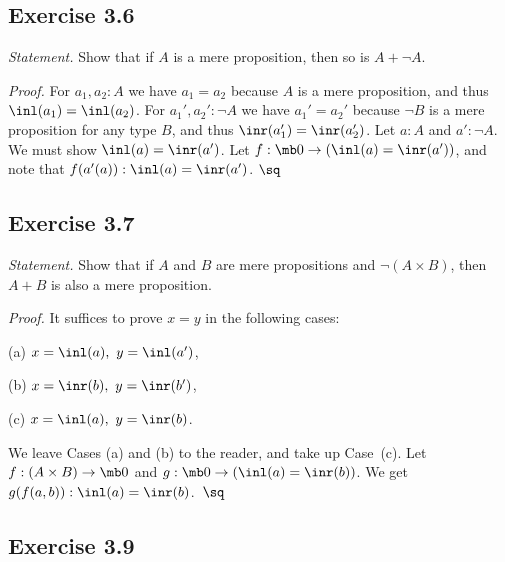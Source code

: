 \documentclass[12pt]{article}
\begin{document}

\subsection{Exercise 3.6}\label{e36}

\emph{Statement.} Show that if $A$ is a mere proposition, then so is $A+\neg A$.

\nn\emph{Proof.} For $a_1,a_2:A$ we have $a_1=a_2$ because $A$ is a mere proposition, and thus $\inl(a_1)=\inl(a_2)$. For $a_1',a_2':\neg A$ we have $a_1'=a_2'$ because $\neg B$ is a mere proposition for any type $B$, and thus $\inr(a_1')=\inr(a_2')$. Let $a:A$ and $a':\neg A$. We must show $\inl(a)=\inr(a')$. Let $f:\mb0\to(\inl(a)=\inr(a'))$, and note that $f(a'(a)):\inl(a)=\inr(a')$. $\sq$


\subsection{Exercise 3.7}

\emph{Statement.} Show that if $A$ and $B$ are mere propositions and $\neg(A\times B)$, then $A+B$ is also a mere proposition.

\emph{Proof.} %
It suffices to prove $x=y$ in the following cases:

(a) $x=\inl(a),\ y=\inl(a')$,

(b) $x=\inr(b),\ y=\inr(b')$,

(c) $x=\inl(a),\ y=\inr(b)$.

\nn We leave Cases (a) and (b) to the reader, and take up Case~(c). Let $f:(A\times B)\to\mb0$ and $g:\mb0\to(\inl(a)=\inr(b))$. We get $g(f(a,b)):\inl(a)=\inr(b)$.\ $\sq$


\subsection{Exercise 3.9}
\end{document}
